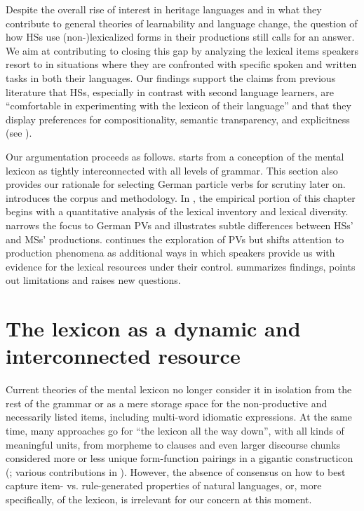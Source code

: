 \documentclass[output=paper,colorlinks,citecolor=brown]{langscibook}
\begin{document}
Despite the overall rise of interest in heritage languages and in what they contribute to general theories of learnability and language change, the question of how HSs use (non-)lexicalized forms in their productions still calls for an answer. We aim at contributing to closing this gap by analyzing the lexical items speakers resort to in situations where they are confronted with specific spoken and written tasks in both their languages. Our findings support the claims from previous literature that HSs, especially in contrast with second language learners, are ``comfortable in experimenting with the lexicon of their language'' \citep[294--295]{Polinsky2018HeritageLanguages} and that they display preferences for compositionality, semantic transparency, and explicitness (see \citealt{RakhilinaVyrenkovaPolinsky2016Creativity, PashkovaHodgeShanley2020Explicitness}). 

Our argumentation proceeds as follows.  starts from a conception of the mental lexicon as tightly interconnected with all levels of grammar. This section also provides our rationale for selecting German particle verbs for scrutiny later on.  introduces the corpus and methodology. In , the empirical portion of this chapter begins with a quantitative analysis of the lexical inventory and lexical diversity.  narrows the focus to German PVs and illustrates subtle differences between HSs’ and MSs’ productions.  continues the exploration of PVs but shifts attention to production phenomena as additional ways in which speakers provide us with evidence for the lexical resources under their control.  summarizes findings, points out limitations and raises new questions.


\section{The lexicon as a dynamic and interconnected resource}\label{sec:kelleretal:lextheory}
\largerpage

Current theories of the mental lexicon no longer consider it in isolation from the rest of the grammar or as a mere storage space for the non-productive and necessarily listed items, including multi-word idiomatic expressions. At the same time, many approaches go for ``the lexicon all the way down'', with all kinds of meaningful units, from morpheme to clauses and even larger discourse chunks considered more or less unique form-function pairings in a gigantic constructicon (\citealt{Goldberg2005Constructions,Tomasello2006, Bybee2010}; various contributions in \citealt{EngelbergHollerProost2011}). However, the absence of consensus on how to best capture item- vs. rule-generated properties of natural languages, or, more specifically, of the lexicon, is irrelevant for our concern at this moment. 
\end{document}
